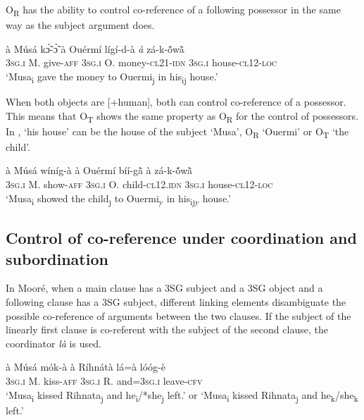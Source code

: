 \documentclass[output=paper]{langsci/langscibook}
\begin{document}
O\textsubscript{R} has the ability to control co-reference of a following possessor in the same way as the subject argument does.

\ea
\label{ex:35.pacchiarotti}
\gll à Músá kɔ̃́-ɔ̃̀ à Ouérmí lígí-d-à \textit{à} zá-k-\'{õ}w\`{ã}  \\
\textsc{3sg.i}  M.  give-\textsc{aff} \textsc{3sg.i} O. money-\textsc{cl21-idn} \textsc{3sg.i}  house-\textsc{cl12-loc}\\
\glt `Musa\textsubscript{i} gave the money to Ouermi\textsubscript{j} in his\textsubscript{ij} house.'
\z

When both objects are [+human], both can control co-reference of a possessor. This means that O\textsubscript{T} shows the same property as O\textsubscript{R} for the control of possessors. In , `his house' can be the house of the subject `Musa', O\textsubscript{R} `Ouermi' or O\textsubscript{T} `the child'.

\ea
\label{ex:36.pacchiarotti}
\gll à Músá wíníg-à à Ouérmí bíí-g\`{ã} à zá-k-\'{õ}w\`{ã}  \\
\textsc{3sg.i}  M.  show-\textsc{aff} \textsc{3sg.i} O. child\textsc{-cl12.idn} \textsc{3sg.i} house-\textsc{cl12-loc}\\
\glt `Musa\textsubscript{i} showed the child\textsubscript{j} to Ouermi\textsubscript{y} in his\textsubscript{ijy} house.' 
\z

\subsection{Control of co-reference under coordination and subordination}\label{§5.3:control.pacchiarotti}

In Mooré, when a main clause has a 3SG subject and a 3SG object and a following clause has a 3SG subject, different linking elements disambiguate the possible co-reference of arguments between the two clauses. If the subject of the linearly first clause is co-referent with the subject of the second clause, the coordinator \textit{là} is used.

\ea
\label{ex:37.pacchiarotti}
\gll à    Músá  mók-à    à    Ríhnátà  lá=à      lóóg-è\\
\textsc{3sg.i}    M.  kiss-\textsc{aff}  \textsc{3sg.i} R.    and=\textsc{3sg.i}    leave-\textsc{cfv}\\
\glt `Musa\textsubscript{i} kissed Rihnata\textsubscript{j} and he\textsubscript{i}/*she\textsubscript{j} left.' or `Musa\textsubscript{i} kissed Rihnata\textsubscript{j} and he\textsubscript{k}/she\textsubscript{k} left.'
\z
\end{document}
